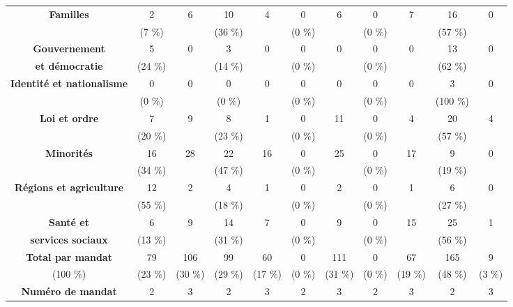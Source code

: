 \documentclass{article}
\begin{document}
\begin{landscape}
\begin {table}[]
\begin{tabularx}{\linewidth}{ c *{10}{C} }
\textbf{Familles} & 2 & 6 & 10 & 4 & 0 & 6 & 0 & 7 & 16 & 0 \\
& (7 \%)  & & (36 \%)  & & (0 \%)  & & (0 \%)  & & (57 \%)  &  \\ \hline  
  
\textbf{Gouvernement} & 5 & 0 & 3 & 0 & 0 & 0 & 0 & 0 & 13 & 0 \\
\textbf{et démocratie} & (24 \%)  & & (14 \%) & &  (0 \%) &  & (0 \%) & &  (62 \%)  &  \\ \hline
  
\textbf{Identité et nationalisme} & 0 & 0 & 0 & 0 & 0 & 0 & 0 & 0 & 3 & 0 \\
& (0 \%) &  & (0 \%) &  & (0 \%) &  & (0 \%) &  & (100 \%)\\ \hline
  
\textbf{Loi et ordre} & 7 & 9 & 8 & 1 & 0 & 11 & 0 & 4 & 20 & 4 \\
& (20 \%) &  & (23 \%) &  & (0 \%) &  & (0 \%) &  & (57 \%)  &  \\ \hline  

\textbf{Minorités} & 16 & 28 & 22 & 16 & 0 & 25 & 0 & 17 & 9 & 0  \\
& (34 \%) &  & (47 \%) &  & (0 \%) &  & (0 \%) & &  (19 \%)  &  \\ \hline

\textbf{Régions et agriculture} & 12 & 2 & 4 & 1 & 0 & 2 & 0 & 1 & 6 & 0 \\
 & (55 \%) &  & (18 \%) & &  (0 \%) & &  (0 \%) &  & (27 \%)  & \\ \hline

\textbf{Santé et} & 6 & 9 & 14 & 7 & 0  &  9 & 0 & 15 & 25 & 1 \\
\textbf{services sociaux} & (13 \%)  & & (31 \%)  & & (0 \%) & & (0 \%) & &  (56 \%)  & \\ \hline 

\textbf{Total par mandat} & 79  & 106 & 99  & 60 & 0  & 111 & 0  & 67 & 165 & 9  \\
(100 \%) & (23 \%) & (30 \%) & (29 \%) & (17 \%) & (0 \%) & (31 \%) & (0 \%) & (19 \%) & (48 \%) & (3 \%) \\ \hline
 
\textbf{Numéro de mandat} & 2 & 3 & 2 & 3 & 2 & 3 & 2 & 3 & 2 & 3\\ \hline

    \bottomrule
\end{tabularx}
    \end{table}
    \end{landscape}
\end{document}
